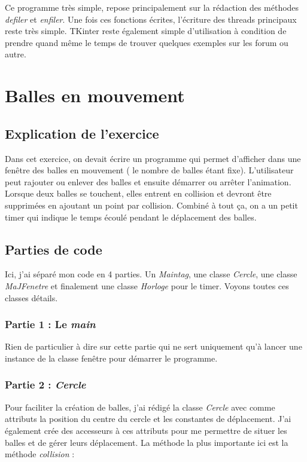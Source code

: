 \documentclass{article}
\begin{document}
Ce programme très simple, repose principalement sur la rédaction des méthodes \textit{defiler} et \textit{enfiler}. Une fois ces fonctions écrites, l'écriture des threads principaux reste très simple. TKinter reste également simple d'utilisation à condition de prendre quand même le temps de trouver quelques exemples sur les forum ou autre.

\section{Balles en mouvement}
\subsection{Explication de l'exercice}

Dans cet exercice, on devait écrire un programme qui permet d'afficher dans une fenêtre des balles en mouvement ( le nombre de balles étant fixe). L'utilisateur peut rajouter ou enlever des balles et ensuite démarrer ou arrêter l'animation. Lorsque deux balles se touchent, elles entrent en collision et devront être supprimées en ajoutant un point par collision. Combiné à tout ça, on a un petit timer qui indique le temps écoulé pendant le déplacement des balles.

\subsection{Parties de code}

Ici, j'ai séparé mon code en 4 parties. Un \textit{Maintag}, une classe \textit{Cercle}, une classe \textit{MaJFenetre} et finalement une classe \textit{Horloge} pour le timer. Voyons toutes ces classes détails.

\subsubsection{Partie 1 : Le \textit{main}}

Rien de particulier à dire sur cette partie qui ne sert uniquement qu'à lancer une instance de la classe fenêtre pour démarrer le programme.

\subsubsection{Partie 2 : \textit{Cercle}}

Pour faciliter la création de balles, j'ai rédigé la classe \textit{Cercle} avec comme attributs la position du centre du cercle et les constantes de déplacement. J'ai également crée des accesseurs à ces attributs pour me permettre de situer les balles et de gérer leurs déplacement. La méthode la plus importante ici est la méthode \textit{collision} :
\end{document}
